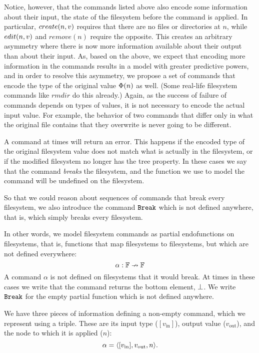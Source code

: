 Notice, however, that the commands listed above also encode some information about 
their input, the state of the filesystem
before the command is applied. In particular, $create(n,v)$ requires that there are no files
or directories at $n$, while $edit(n,v)$ and $remove(n)$ require the opposite.
This creates an arbitrary asymmetry where
there is now more information available about their output than about their input.
As, based on the above, we expect that encoding more information in the commands
results in a model with greater predictive powers,
and in order to resolve this asymmetry, 
we propose a set of commands that encode
the type of the original value $\Phi(n)$ as well.
(Some real-life filesystem commands like $rmdir$ do this already.)
Again, as the success of failure of commands depends on types of values,
it is not necessary to encode the actual input value.
For example, the behavior of two commands that differ only in what the original file contains
that they overwrite is never going to be different.

\bigskip


\noindent
A command at times will return an error.
This happens if the encoded type of the original filesystem value does not match
what is actually in the filesystem, or if the modified filesystem no
longer has the tree property.
In these cases we say that the command {\em breaks} the filesystem,
and the function we use to model the command will be undefined on the filesystem.

So that we could reason about sequences of commands that break every filesystem, 
we also introduce the command $\mathtt{Break}$ which is not defined anywhere,
that is, which simply breaks every filesystem.


\begin{mydef}
In other words, we model filesystem commands as partial endofunctions on filesystems,
that is, functions that map filesystems to filesystems, but which
are not defined everywhere:
\[ \alpha: \mathbb{F} \nrightarrow \mathbb{F} \]
A command $\alpha$ is not defined on filesystems that it would break.
At times in these cases we write that the command returns the bottom element, $\bot$.
We write $\mathtt{Break}$ for the empty partial function which is not defined anywhere.

We have three pieces of information defining a non-empty command,
which we represent using a triple. These are its
input type ($[v_\textrm{in}]$), output value ($v_\textrm{out}$),
and the node to which it is applied ($n$):
\[ \alpha = \langle{[v_\textrm{in}],v_\textrm{out},n}\rangle. \]
\end{mydef}

